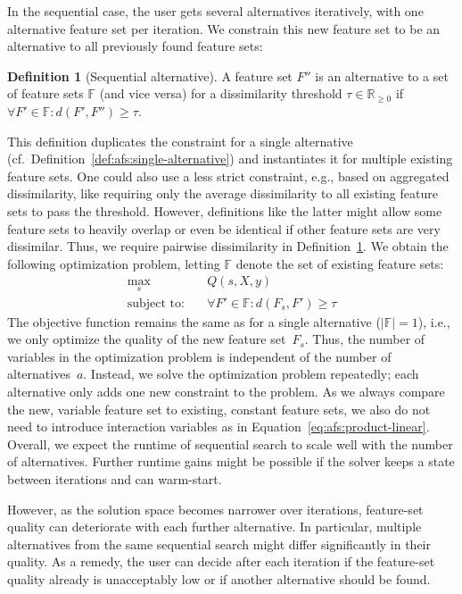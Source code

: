 \documentclass{article}
\theoremstyle{definition}
\newtheorem{definition}{Definition}
\begin{document}
In the sequential case, the user gets several alternatives iteratively, with one alternative feature set per iteration.
We constrain this new feature set to be an alternative to all previously found feature sets:
%
\begin{definition}[Sequential alternative]
	A feature set $F''$ is an alternative to a set of feature sets $\mathbb{F}$ (and vice versa) for a dissimilarity threshold $\tau \in \mathbb{R}_{\geq 0}$ if $\forall F' \in \mathbb{F}: d(F',F'') \geq \tau$.
	\label{def:afs:sequential-alternative}
\end{definition}
%
This definition duplicates the constraint for a single alternative (cf.~Definition~\ref{def:afs:single-alternative}) and instantiates it for multiple existing feature sets.
One could also use a less strict constraint, e.g., based on aggregated dissimilarity, like requiring only the average dissimilarity to all existing feature sets to pass the threshold.
However, definitions like the latter might allow some feature sets to heavily overlap or even be identical if other feature sets are very dissimilar.
Thus, we require pairwise dissimilarity in Definition~\ref{def:afs:sequential-alternative}.
We obtain the following optimization problem, letting $\mathbb{F}$ denote the set of existing feature sets:
%
\begin{equation}
	\begin{aligned}
		\max_s &\quad Q(s,X,y) \\
		\text{subject to:} &\quad \forall F' \in \mathbb{F}: d(F_s,F') \geq \tau
	\end{aligned}
	\label{eq:afs:afs-sequential}
\end{equation}
%
The objective function remains the same as for a single alternative ($|\mathbb{F}| = 1$), i.e., we only optimize the quality of the new feature set~$F_s$.
Thus, the number of variables in the optimization problem is independent of the number of alternatives~$a$.
Instead, we solve the optimization problem repeatedly; each alternative only adds one new constraint to the problem.
As we always compare the new, variable feature set to existing, constant feature sets, we also do not need to introduce interaction variables as in Equation~\ref{eq:afs:product-linear}.
Overall, we expect the runtime of sequential search to scale well with the number of alternatives.
Further runtime gains might be possible if the solver keeps a state between iterations and can warm-start.

However, as the solution space becomes narrower over iterations, feature-set quality can deteriorate with each further alternative.
In particular, multiple alternatives from the same sequential search might differ significantly in their quality.
As a remedy, the user can decide after each iteration if the feature-set quality already is unacceptably low or if another alternative should be found.
\end{document}
